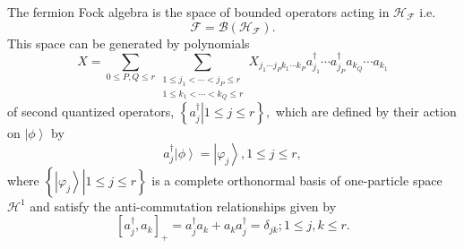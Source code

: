 \documentclass[aps,preprint]{revtex4}%
\begin{document}
The fermion Fock algebra is the space of bounded operators acting in
$\mathcal{H}_{\mathcal{F}}$ i.e.
\begin{equation}
\mathcal{F}=\mathcal{B}\left(  \mathcal{H}_{\mathcal{F}}\right)  .
\end{equation}
This space can be generated by polynomials
\begin{equation}
X=\sum_{0\leq P,Q\leq r}\sum_{\substack{1\leq j_{1}<\cdots<j_{P}\leq r\\1\leq
k_{1}<\cdots<k_{Q}\leq r}}X_{j_{1}\cdots j_{P}k_{1}\cdots k_{P}}a_{j_{1}%
}^{\dagger}\cdots a_{j_{P}}^{\dagger}a_{k_{Q}}\cdots a_{k_{1}}%
\end{equation}
of second quantized operators, $\left\{  \left.  a_{j}^{\dagger}\right\vert
1\leq j\leq r\right\}  ,$ which are defined by their action on $\left\vert
\phi\right\rangle $ by
\begin{equation}
a_{j}^{\dagger}\left\vert \phi\right\rangle =\left\vert \varphi_{j}%
\right\rangle ,1\leq j\leq r,
\end{equation}
where $\left\{  \left.  \left\vert \varphi_{j}\right\rangle \right\vert 1\leq
j\leq r\right\}  $ is a complete orthonormal basis of one-particle space
$\mathcal{H}^{1}$ and satisfy the anti-commutation relationships given by
\begin{equation}
\left[  a_{j}^{\dagger},a_{k}\right]  _{+}=a_{j}^{\dagger}a_{k}+a_{k}%
a_{j}^{\dagger}=\delta_{jk};1\leq j,k\leq r. \label{CAR}%
\end{equation}
\end{document}
